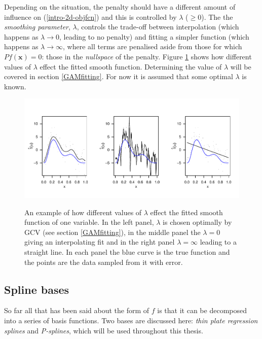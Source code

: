 Depending on the situation, the penalty should have a different amount of influence on (\ref{intro-2d-objfcn}) and this is controlled by $\lambda$ ($\geq0$). The the \textit{smoothing parameter}, $\lambda$, controls the trade-off between interpolation (which happens as $\lambda \rightarrow 0$, leading to no penalty) and fitting a simpler function (which happens as $\lambda \rightarrow \infty$, where all terms are penalised aside from those for which $Pf(\mathbf{x})=0$: those in the \textit{nullspace} of the penalty. Figure \ref{lambda-ex} shows how different values of $\lambda$ effect the fitted smooth function. Determining the value of $\lambda$ will be covered in section \ref{GAMfitting}. For now it is assumed that some optimal $\lambda$ is known.

\begin{figure}[tb]
\centering
\includegraphics[width=6in]{intro/figs/lambda-ex.pdf}\\
\caption{An example of how different values of $\lambda$ effect the fitted smooth function of one variable. In the left panel, $\lambda$ is chosen optimally by GCV (see section \ref{GAMfitting}), in the middle panel the $\lambda=0$ giving an interpolating fit and in the right panel $\lambda=\infty$ leading to a straight line. In each panel the blue curve is the true function and the points are the data sampled from it with error.}
\label{lambda-ex}
\end{figure}


\subsection{Spline bases}

So far all that has been said about the form of $f$ is that it can be decomposed into a series of basis functions. Two bases are discussed here: \textit{thin plate regression splines} and \textit{P-splines}, which will be used throughout this thesis.

